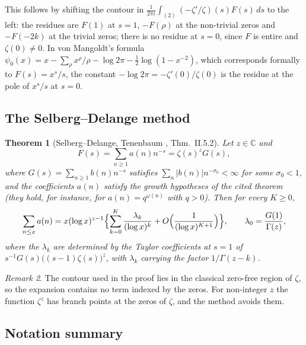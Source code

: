\documentclass[11pt]{amsart}
\newtheorem{theorem}{Theorem}[section]
\theoremstyle{definition}
\theoremstyle{remark}
\newtheorem{remark}[theorem]{Remark}
\newcommand{\half}{\tfrac{1}{2}}
\newcommand{\om}{\omega}
\begin{document}
This follows by shifting the contour in
$\frac1{2\pi i}\int_{(2)}(-\zeta'/\zeta)(s)F(s)\,ds$ to the left: the residues are $F(1)$
at $s=1$, $-F(\rho)$ at the non-trivial zeros and $-F(-2k)$ at the trivial zeros; there is
no residue at $s=0$, since $F$ is entire and $\zeta(0)\ne0$. In von Mangoldt's formula
$\psi_0(x)=x-\sum_\rho x^\rho/\rho-\log2\pi-\half\log(1-x^{-2})$, which corresponds
formally to $F(s)=x^s/s$, the constant $-\log2\pi=-\zeta'(0)/\zeta(0)$ is the residue at the
pole of $x^s/s$ at $s=0$.

\subsection{The Selberg--Delange method}
\label{ss:SD}

\begin{theorem}[Selberg--Delange, Tenenbaum \cite{Ten15}, Thm.~II.5.2]
\label{thm:SD}
Let $z\in\mathbb{C}$ and
\[
F(s) = \sum_{n\ge1} a(n)n^{-s} = \zeta(s)^z G(s),
\]
where $G(s)=\sum_{n\ge1}b(n)n^{-s}$ satisfies $\sum_n|b(n)|n^{-\sigma_0}<\infty$ for some
$\sigma_0<1$, and the coefficients $a(n)$ satisfy the growth hypotheses of the cited
theorem (they hold, for instance, for $a(n)=q^{\om(n)}$ with $q>0$). Then for every $K\ge0$,
\[
  \sum_{n\le x} a(n) =
  x (\log x)^{z-1}
  \Bigl\{ \sum_{k=0}^K \frac{\lambda_k}{(\log x)^k} + O\Bigl(\frac{1}{(\log x)^{K+1}}\Bigr)\Bigr\},
  \qquad \lambda_0=\frac{G(1)}{\Gamma(z)},
\]
where the $\lambda_k$ are determined by the Taylor coefficients at $s=1$ of
$s^{-1}G(s)\bigl((s-1)\zeta(s)\bigr)^z$, with $\lambda_k$ carrying the factor
$1/\Gamma(z-k)$.
\end{theorem}

\begin{remark}
The contour used in the proof lies in the classical zero-free region of $\zeta$, so the
expansion contains no term indexed by the zeros. For non-integer $z$ the function $\zeta^z$
has branch points at the zeros of $\zeta$, and the method avoids them.
\end{remark}

\subsection{Notation summary}
\label{ss:notation}
\end{document}
